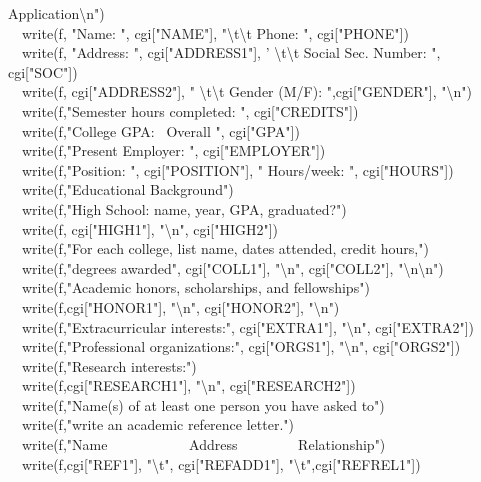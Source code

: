 {{Application{\textbackslash}n") \\
\ \ write(f, "Name: ",
cgi["NAME"],
"{\textbackslash}t{\textbackslash}t Phone: ", cgi["PHONE"]) \\
\ \ write(f, "Address: ", cgi["ADDRESS1"], '
{\textbackslash}t{\textbackslash}t Social Sec. Number: ", cgi["SOC"]) \\
\ \ write(f, cgi["ADDRESS2"],
" {\textbackslash}t{\textbackslash}t Gender (M/F):
",cgi["GENDER"],
"{\textbackslash}n") \\
\ \ write(f,"Semester hours completed: ",
cgi["CREDITS"]) \\
\ \ write(f,"College GPA: \ Overall ",
cgi["GPA"]) \\
\ \ write(f,"Present Employer: ",
cgi["EMPLOYER"]) \\
\ \ write(f,"Position: ", cgi["POSITION"], " Hours/week: ", cgi["HOURS"]) \\
\ \ write(f,"Educational Background") \\
\ \ write(f,"High School: name, year, GPA,
		graduated?") \\
\ \ write(f, cgi["HIGH1"],
"{\textbackslash}n",
cgi["HIGH2"]) \\
\ \ write(f,"For each college, list name, dates attended,
credit hours,") \\
\ \ write(f,"degrees awarded", cgi["COLL1"], "{\textbackslash}n", cgi["COLL2"],
"{\textbackslash}n{\textbackslash}n") \\
\ \ write(f,"Academic honors, scholarships, and
fellowships") \\
\ \ write(f,cgi["HONOR1"],
"{\textbackslash}n",
cgi["HONOR2"],
"{\textbackslash}n") \\
\ \ write(f,"Extracurricular interests:", cgi["EXTRA1"],
"{\textbackslash}n",
cgi["EXTRA2"]) \\
\ \ write(f,"Professional organizations:",
cgi["ORGS1"],
"{\textbackslash}n",
cgi["ORGS2"]) \\
\ \ write(f,"Research interests:") \\
\ \ write(f,cgi["RESEARCH1"],
"{\textbackslash}n",
cgi["RESEARCH2"]) \\
\ \ write(f,"Name(s) of at least one person you have asked
to") \\
\ \ write(f,"write an academic reference
letter.") \\
\ \ write(f,"Name \ \ \ \ \ \ \ \ \ \ \ Address
\ \ \ \ \ \ \ \ Relationship") \\
\ \ write(f,cgi["REF1"],
"{\textbackslash}t",
cgi["REFADD1"],
"{\textbackslash}t",cgi["REFREL1"]) \\
}}

